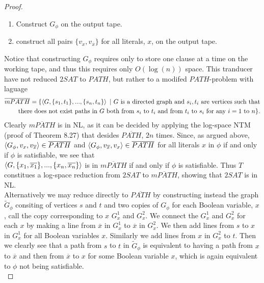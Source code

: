 \documentclass[a4paper,11pt]{article}
\newcommand{\pipe}{\ \vert \ }
\numberwithin{equation}{section}
\begin{document}
\begin{proof}
\begin{enumerate}
				\item Construct $ G_\phi $ on the output tape.
				\item construct all pairs $\{v_x,v_{\overline{x}}\}$ for all literals, $x$, on the output tape.
			\end{enumerate}
			Notice that constructing $ G_\phi $ requires only to store one clause at a time on the working tape, and thus this requires only $ O(\log(n)) $ space. This tranducer have not reduced $ 2SAT $ to $ PATH $, but rather to a modifed $ PATH $-problem with laguage \begin{equation*}
			\begin{aligned}
			\overline{mPATH}=\{\braket{G,\{s_1,t_1\},...,\{s_n,t_n\}}\pipe G\text{ is a directed graph and } s_i,t_i\text{ are vertices such that}\\ \text{there does not exist paths in }G\text{ both from }s_i \text{ to }t_i \text{ and from }t_i\text{ to }s_i\text{ for any }i=1\text{ to }n\}.
			\end{aligned}
			\end{equation*}
			Clearly $ \overline{mPATH} $ is in NL, as it can be decided by applying the log-space NTM (proof of Theorem 8.27) that desides $ \overline{PATH} $, $ 2n $ times.
			Since, as argued above, $ \braket{G_\phi,v_x,v_{\overline{x}}}\in \overline{PATH} $ and $ \braket{G_\phi,v_{\overline{x}},v_{x}}\in \overline{PATH }$ for all literals $ x $ in $ \phi $ if and only if $ \phi $ is satisfiable, we see that\\ $ \braket{G,\{x_1,\overline{x_1}\},...,\{x_n,\overline{x_n}\}} $ is in $\overline{ mPATH} $ if and only if $ \phi $ is satisfiable. Thus $ T $ constitues a log-space reduction from $ 2SAT $ to $ \overline{mPATH} $, showing that $2SAT $ is in NL.\\
			Alternatively we may reduce directly to $ \overline{PATH} $ by constructing instead the graph $ \tilde{G}_\phi $ consiting of vertices $ s $ and $ t $ and two copies of $ G_\phi $ for each Boolean variable, $ x $, call the copy corresponding to $ x $ $ G_x^1 $ and $ G^2_x $. We connect the $ G_x^1 $ and $ G_x^2 $ for each $ x $ by making a line from $ \overline{x} $ in $ G_x^1 $ to $ \overline{x} $ in $ G_x^2 $. We then add lines from $ s $ to $ x $ in $ G_x^1 $ for all Boolean variables $ x $. Similarly we add lines from $ x $ in $ G_x^2 $ to $ t $. Then we clearly see that a path from $ s $ to $ t $ in $ \tilde{G}_\phi $ is equivalent to having a path from $ x $ to $ \overline{x} $ and then from $ \overline{x} $ to $ x $ for some Boolean variable $ x $, which is again equivalent to $ \phi $ not being satisfiable.\\

\end{proof}
\end{document}
